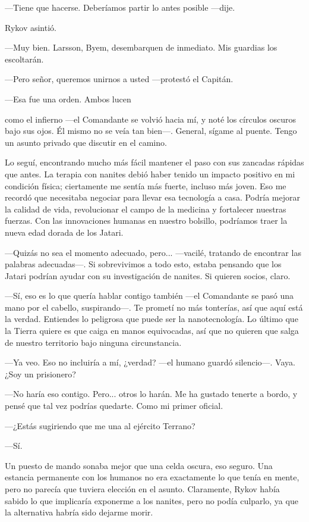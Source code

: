 —Tiene que hacerse. Deberíamos partir lo antes posible —dije.

Rykov asintió.

—Muy bien. Larsson, Byem, desembarquen de inmediato. Mis guardias los escoltarán.

—Pero señor, queremos unirnos a usted —protestó el Capitán.

—Esa fue una orden. Ambos lucen

como el infierno —el Comandante se volvió hacia mí, y noté los círculos oscuros bajo sus ojos. Él mismo no se veía tan bien—. General, sígame al puente. Tengo un asunto privado que discutir en el camino.

Lo seguí, encontrando mucho más fácil mantener el paso con sus zancadas rápidas que antes. La terapia con nanites debió haber tenido un impacto positivo en mi condición física; ciertamente me sentía más fuerte, incluso más joven. Eso me recordó que necesitaba negociar para llevar esa tecnología a casa. Podría mejorar la calidad de vida, revolucionar el campo de la medicina y fortalecer nuestras fuerzas. Con las innovaciones humanas en nuestro bolsillo, podríamos traer la nueva edad dorada de los Jatari.

—Quizás no sea el momento adecuado, pero... —vacilé, tratando de encontrar las palabras adecuadas—. Si sobrevivimos a todo esto, estaba pensando que los Jatari podrían ayudar con su investigación de nanites. Si quieren socios, claro.

—Sí, eso es lo que quería hablar contigo también —el Comandante se pasó una mano por el cabello, suspirando—. Te prometí no más tonterías, así que aquí está la verdad. Entiendes lo peligrosa que puede ser la nanotecnología. Lo último que la Tierra quiere es que caiga en manos equivocadas, así que no quieren que salga de nuestro territorio bajo ninguna circunstancia.

—Ya veo. Eso no incluiría a mí, ¿verdad? —el humano guardó silencio—. Vaya. ¿Soy un prisionero?

—No haría eso contigo. Pero... otros lo harán. Me ha gustado tenerte a bordo, y pensé que tal vez podrías quedarte. Como mi primer oficial.

—¿Estás sugiriendo que me una al ejército Terrano?

—Sí.

Un puesto de mando sonaba mejor que una celda oscura, eso seguro. Una estancia permanente con los humanos no era exactamente lo que tenía en mente, pero no parecía que tuviera elección en el asunto. Claramente, Rykov había sabido lo que implicaría exponerme a los nanites, pero no podía culparlo, ya que la alternativa habría sido dejarme morir.

